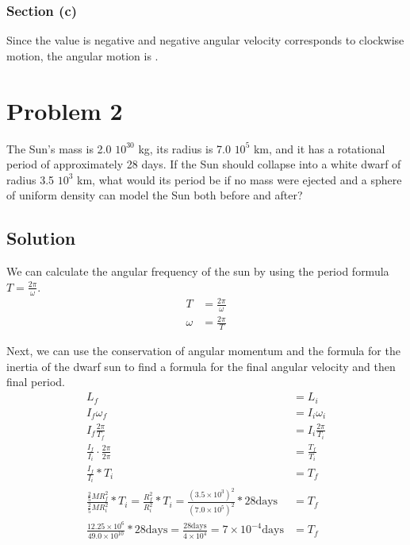 \documentclass[12pt]{article}
\begin{document}
\subsubsection{Section (c)}
Since the value is negative and negative angular velocity corresponds to clockwise motion, the angular motion is .

\pagebreak
\section{Problem 2}
The Sun's mass is 2.0 \texttimes $10^{30}$ kg, its radius is 7.0 \texttimes $10^5$ km, and it has a rotational period of approximately 28 days. If the Sun should collapse into a white dwarf of radius 3.5 \texttimes $10^3$ km, what would its period be if no mass were ejected and a sphere of uniform density can model the Sun both before and after?

\subsection{Solution}

We can calculate the angular frequency of the sun by using the period formula \(T = \frac{2\pi}{\omega}\).
\begin{align}
    T   &=  \frac{2\pi}{\omega}\\
    \omega  &=  \frac{2\pi}{T}
\end{align}

Next, we can use the conservation of angular momentum and the formula for the inertia of the dwarf sun to find a formula for the final angular velocity and then final period.
\begin{align}
    L_f &=  L_i\\
    I_f\omega_f &=  I_i\omega_i\\
    I_f\frac{2\pi}{T_f} &=  I_i\frac{2\pi}{T_i}\\
    \frac{I_f}{I_i}\cdot\frac{2\pi}{2\pi}   &=  \frac{T_f}{T_i}\\
    \frac{I_f}{I_i}*T_i &=  T_f\\
    \frac{\frac{2}{5}MR_f^2}{\frac{2}{5}MR_i^2}*T_i =
    \frac{R_f^2}{R_i^2}*T_i =
    \frac{(3.5 \times 10^{3})^2}{(7.0 \times 10^{5})^2}*28\text{days}   &=  T_f\\
    \frac{12.25 \times 10^{6}}{49.0 \times 10^{10}}*28\text{days}   =
    \frac{28\text{days}}{4 \times 10^4} =
    7 \times 10^{-4} \text{days}    &=  T_f
\end{align}
\end{document}

